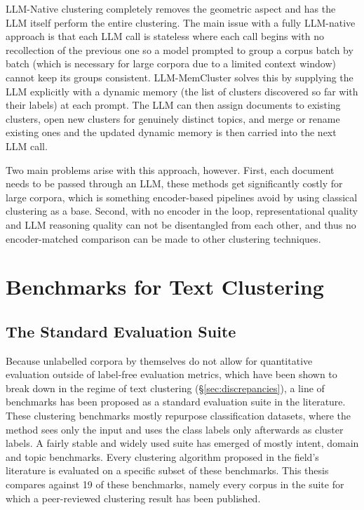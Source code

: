 \documentclass[11pt,a4paper,oneside]{report}
\begin{document}
LLM-Native clustering completely removes the geometric aspect and has the LLM itself perform the entire clustering. The main issue with a fully LLM-native approach is that each LLM call is stateless where each call begins with no recollection of the previous one so a model prompted to group a corpus batch by batch (which is necessary for large corpora due to a limited context window) cannot keep its groups consistent. LLM-MemCluster \citep{zhu2025memcluster} solves this by supplying the LLM explicitly with a dynamic memory (the list of clusters discovered so far with their labels) at each prompt. The LLM can then assign documents to existing clusters, open new clusters for genuinely distinct topics, and merge or rename existing ones and the updated dynamic memory is then carried into the next LLM call.

Two main problems arise with this approach, however. First, each document needs to be passed through an LLM, these methods get significantly costly for large corpora, which is something encoder-based pipelines avoid by using classical clustering as a base. Second, with no encoder in the loop, representational quality and LLM reasoning quality can not be disentangled from each other, and thus no encoder-matched comparison can be made to other clustering techniques.

\section{Benchmarks for Text Clustering}\label{sec:benchmarks}

\subsection{The Standard Evaluation Suite}\label{sec:suite}

Because unlabelled corpora by themselves do not allow for quantitative evaluation outside of label-free evaluation metrics, which have been shown to break down in the regime of text clustering (\S\ref{sec:discrepancies}), a line of benchmarks has been proposed as a standard evaluation suite in the literature. These clustering benchmarks mostly repurpose classification datasets, where the method sees only the input and uses the class labels only afterwards as cluster labels. A fairly stable and widely used suite has emerged of mostly intent, domain and topic benchmarks. Every clustering algorithm proposed in the field's literature is evaluated on a specific subset of these benchmarks. This thesis compares against 19 of these benchmarks, namely every corpus in the suite for which a peer-reviewed clustering result has been published.
\end{document}
